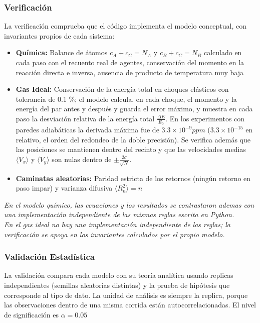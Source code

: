\documentclass{article}
\begin{document}
\subsubsection{Verificación}
La verificación comprueba que el código implementa el modelo conceptual, con invariantes propios de cada sistema:
\begin{itemize}
    \item \textbf{Química:} Balance de átomos $c_A+c_C=N_A$ y $c_B+c_C=N_B$ calculado en cada paso con el recuento real de agentes, conservación del momento en la reacción directa e inversa, ausencia de producto de temperatura muy baja
    \item \textbf{Gas Ideal:} Conservación de la energía total en choques elásticos con tolerancia de 0.1 \%; el modelo calcula, en cada choque, el momento y la energía del par antes y después y guarda el error máximo, y muestra en cada paso la desviación relativa de la energía total $\frac{\Delta E}{E_0}$. En los experimentos con paredes adiabáticas la derivada máxima fue de $3.3 \times 10^{-9} ppm$ ($3.3 \times 10^{-15}$ en relativo, el orden del redondeo de la doble precisión). Se verifica además que las posiciones se mantienen dentro del recinto y que las velocidades medias $\langle V_x\rangle$ y $\langle V_y\rangle$ son nulas dentro de $\pm \frac{2\sigma}{\sqrt{N}}$. 
    \item \textbf{Caminatas aleatorias:} Paridad estricta de los retornos (ningún retorno en paso impar) y varianza difusiva $\langle R_n^2 \rangle=n$
\end{itemize}
\textit{En el modelo químico, las ecuaciones y los resultados se contrastaron ademas con una implementación independiente de las mismas reglas escrita en Python.} \\
\textit{En el gas ideal no hay una implementación independiente de las reglas; la verificación se apoya en los invariantes calculados por el propio modelo.}

\subsubsection{Validación Estadística}
La validación compara cada modelo con su teoría analítica usando replicas independientes (semillas aleatorias distintas) y la prueba de hipótesis que corresponde al tipo de dato. La unidad de análisis es siempre la replica, porque las observaciones dentro de una misma corrida están autocorrelacionadas. El nivel de significación es $\alpha=0.05$
\end{document}
